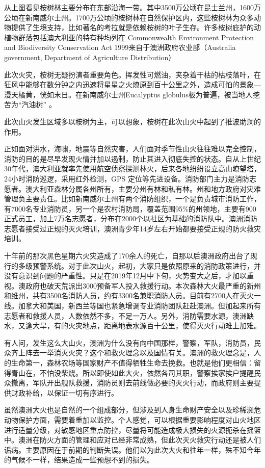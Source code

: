 \documentclass[]{book}
\begin{document}
从上图看见桉树林主要分布在东部沿海一带。其中3500万公顷在昆士兰州，1600万公顷在新南威尔士州。1700万公顷的桉树林在自然保护区内，这些桉树林为众多动物提供了生境支持，比如著名的考拉就是依赖桉树的叶子生存。许多桉树庇护的动植物群落包括澳大利亚的特有种均列在 Commonwealth Environment Protection and Biodiversity Conservation Act 1999来自于澳洲政府农业部（Australia government, Department of Agriculture Distribution）

此次火灾，桉树无疑扮演者重要角色。挥发性可燃油，夹杂着干枯的枯枝落叶，在狂风中能够在数分钟之内迅速将星星之火燎原到百十公里之外，造成可怕的景象---漫天橘黄，恍如末日。在新南威尔士州Eucalyptus globulus极为普遍，被当地人挖苦为``汽油树'' 。

此次山火发生区域多以桉树为主，可以想象，桉树在此次山火中起到了推波助澜的作用。

正如面对洪水，海啸，地震等自然灾害，人们面对季节性山火往往难以完全控制，消防的目的是尽早发现火情并加以遏制，防止其进入彻底失控的状态。自从上世纪30年代，澳大利亚就率先使用航空侦察探测林火，后来各地纷纷设立高山瞭望塔，24小时消防巡逻，采用红外检测，GPS 定位等先进设备。消防部门主力是消防志愿者。澳大利亚森林分属各州所有，主要分州有林和私有林。州和地方政府对灾难管理负主要责任。比如新南威尔士州有两个消防组织，一个是负责城市消防工作，有7000名专业消防员，另一个是农村消防局，覆盖范围95\%的州领地，主要有900正式员工，加上7万名志愿者，分布在2000个以社区为基础的消防队中。澳洲消防志愿者接受过正规的灭火培训，澳洲青少年14岁左右开始都要接受正规的防火救灾培训。

十年前的那次黑色星期六火灾造成了170余人的死亡，自那以后澳洲政府出台了现行的多级预警系统。对于此次山火，起初，大家只是依照原来的消防政策进行，并没有意识到问题的严重性。只是在2019年12月中下旬，火势变大之后，才加以重视。澳政府也破天荒派出3000预备军人投入救援行动。本次森林大火最严重的新州和维州，共有3500名消防人员，约有3300名兼职消防人员。目前有2700人在灭火一线。加拿大和美国，新西兰等国也紧急增调专业消防团队赶赴澳洲。但加起来所有志愿者和救援人员，人数依然不多，不足一万人。另外，消防需要水源，澳洲缺水，又逢大旱，有的火灾地点，距离地表水源百十公里，使得灭火行动难上加难。

有人问，发生这么大山火，澳洲为什么没有向中国那样，警察，军队，消防员，民众齐上阵去一举消灭火灾？这个和救火理念以及国情有关。澳洲的救火理念是，人的生命第一，森林农场等国家财产不值得牺牲生命去挽救。也就是他们更相信：留得青山在，不怕没柴烧。所以即使如此大火，依然各司其职，警察挨家挨户提醒民众撤离，军队开出舰队救援，消防员则去前线做必要的灭火行动，而政府则主要提供财政补给，以保证一切有序进行。

虽然澳洲大火也是自然的一个组成部分，但涉及到人身生命财产安全以及珍稀濒危动物保护方面，需要着重加以监控。个人感觉，可以根据重要影响程度对山火地区进行适量分级，对敏感地区重点防控，尽量将可能造成极大损失的火源扼杀在摇篮中。澳洲在防火方面的管理和应对已经非常成熟，但此次灭火救灾行动还是被人们诟病。主要原因在于前期的判断失误。他们以为此次大火和往年一样，殊不知今年的气候不一样，结果造成一些预想不到的损失。
\end{document}
